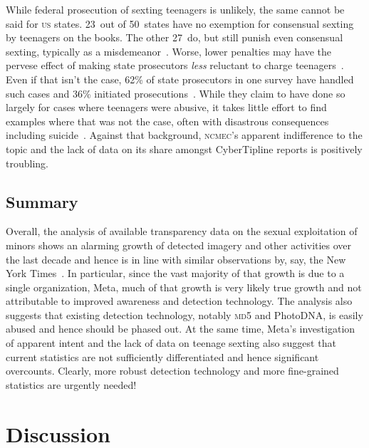\documentclass[nonacm,screen]{acmart}
\newcommand\V[1]{\textsc{\MakeLowercase{#1}}}
\begin{document}
\begin{itemize}
{While federal prosecution of sexting teenagers is unlikely, the same cannot be
said for \V{US} states. 23~out of 50~states have no exemption for consensual
sexting by teenagers on the books. The other 27~do, but still punish even
consensual sexting, typically as a misdemeanor~\cite{HindujaPatchin2022,
HoloydaLandessea2018,StrasburgerZimmermanea2019}. Worse, lower penalties may
have the pervese effect of making state prosecutors \emph{less} reluctant to
charge teenagers~\cite{Hasinoff2016}. Even if that isn't the case, 62\% of state
prosecutors in one survey have handled such cases and 36\% initiated
prosecutions~\cite{WalshWolakea2013}. While they claim to have done so largely
for cases where teenagers were abusive, it takes little effort to find examples
where that was not the case, often with disastrous consequences including
suicide~\cite{Dunlap2016,Feldman2020,Jouvenal2023,LorangMcNielea2016,Miller2015,
WolakFinkelhorea2012}. Against that background, \V{NCMEC}'s apparent
indifference to the topic and the lack of data on its share amongst CyberTipline
reports is positively troubling.


\subsection{Summary}

Overall, the analysis of available transparency data on the sexual exploitation
of minors shows an alarming growth of detected imagery and other activities over
the last decade and hence is in line with similar observations by, say, the New
York Times~\cite{Dance2019,KellerDance2019}. In particular, since the vast
majority of that growth is due to a single organization, Meta, much of that
growth is very likely true growth and not attributable to improved awareness and
detection technology. The analysis also suggests that existing detection
technology, notably \V{\V{MD5}} and PhotoDNA, is easily abused and hence should
be phased out. At the same time, Meta's investigation of apparent intent and the
lack of data on teenage sexting also suggest that current statistics are not
sufficiently differentiated and hence significant overcounts. Clearly, more
robust detection technology and more fine-grained statistics are urgently
needed!



\section{Discussion}
\label{sec:discussion}

}
\end{itemize}
\end{document}
